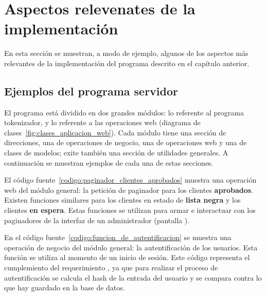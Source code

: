 %
%

\section{Aspectos relevenates de la implementación}

En esta sección se muestran, a modo de ejemplo, algunos de los aspectos más
relevantes de la implementación del programa descrito en el capítulo anterior.

\subsection{Ejemplos del programa servidor}

El programa está dividido en dos grandes módulos: lo referente al programa
tokenizador, y lo referente a las operaciones web (diagrama de
clases~\ref{fig:clases_aplicacion_web}). Cada módulo tiene una sección de
direcciones, una de operaciones de negocio, una de operaciones web y una de
clases de modelos; exite también una sección de utilidades generales. A
continuación se muestran ejemplos de cada una de estas secciones.

El código fuente~\ref{codigo:paginador_clientes_aprobados} muestra una
operación web del módulo general: la petición de paginador para los clientes
\textbf{aprobados}. Existen funciones similares para los clientes en estado de
\textbf{lista negra} y los clientes \textbf{en espera}. Estas funciones se
utilizan para armar e interactuar con los paginadores de la interfaz de un
administrador (pantalla ).


En el código fuente~\ref{codigo:funcion_de_autentificacion} se muestra una
operación de negocio del módulo general: la autentificación de los usuarios.
Esta función se utiliza al momento de un inicio de sesión. Este código
representa el cumplemiento del requerimiento
, ya que para realizar el
proceso de autentificación se calcula el hash de la entrada del usuario y se
compara contra lo que hay guardado en la base de datos.


